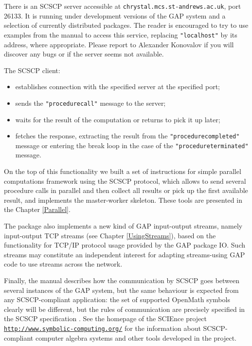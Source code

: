\documentclass[a4paper,11pt]{report}
\begin{document}
{ There is an \textsf{SCSCP} server accessible at \texttt{chrystal.mcs.st-andrews.ac.uk}, port 26133. It is running under development versions of the \textsf{GAP} system and a selection of currently distributed packages. The reader is
encouraged to try to use examples from the manual to access this service,
replacing \texttt{"localhost"} by its address, where appropriate. Please report to Alexander Konovalov if you
will discover any bugs or if the server seems not available. 

 The SCSCP client: 
\begin{itemize}
\item establishes connection with the specified server at the specified port;
\item sends the \texttt{"procedure{\textunderscore}call"} message to the server;
\item waits for the result of the computation or returns to pick it up later;
\item fetches the response, extracting the result from the \texttt{"procedure{\textunderscore}completed"} message or entering the break loop in the case of the \texttt{"procedure{\textunderscore}terminated"} message. 
\end{itemize}
 On the top of this functionality we built a set of instructions for simple
parallel computations framework using the \textsf{SCSCP} protocol, which allows to send several procedure calls in parallel and then
collect all results or pick up the first available result, and implements the
master-worker skeleton. These tools are presented in the Chapter \ref{Parallel}. 

 The package also implements a new kind of \textsf{GAP} input-output streams, namely input-output TCP streams (see Chapter \ref{UsingStreams}), based on the functionality for TCP/IP protocol usage provided by the \textsf{GAP} package \textsf{IO}. Such streams may constitute an independent interest for adapting
streams-using \textsf{GAP} code to use streams across the network. 

 Finally, the manual describes how the communication by \textsf{SCSCP} goes between several instances of the \textsf{GAP} system, but the same behaviour is expected from any \textsf{SCSCP}-compliant application: the set of supported \textsf{OpenMath} symbols clearly will be different, but the rules of communication are
precisely specified in the \textsf{SCSCP} specification \cite{SCSCP}. See the homepage of the SCIEnce project \href{http://www.symbolic-computing.org/} {\texttt{http://www.symbolic-computing.org/}} for the information about \textsf{SCSCP}-compliant computer algebra systems and other tools developed in the project. }
\end{document}
